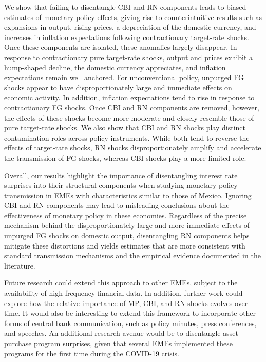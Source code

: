 \documentclass[12pt, reqno]{article}
\begin{document}
We show that failing to disentangle CBI and RN components leads to biased estimates of monetary policy effects, giving rise to counterintuitive results such as expansions in output, rising prices, a depreciation of the domestic currency, and increases in inflation expectations following contractionary target-rate shocks. Once these components are isolated, these anomalies largely disappear. In response to contractionary pure target-rate shocks,  output and prices exhibit a hump-shaped decline, the domestic currency appreciates, and inflation expectations remain well anchored. For unconventional policy, unpurged FG shocks appear to have disproportionately large and immediate effects on economic activity. In addition, inflation expectations tend to rise in response to contractionary FG shocks. Once CBI and RN components are removed, however, the effects of these shocks become more moderate and closely resemble those of pure target-rate shocks. We also show that CBI and RN shocks play distinct contamination roles across policy instruments. While both tend to reverse the effects of target-rate shocks, RN shocks disproportionately amplify and accelerate the transmission of FG shocks, whereas CBI shocks play a more limited role.

Overall, our results highlight the importance of disentangling interest rate surprises into their structural components when studying monetary policy transmission in EMEs with characteristics similar to those of Mexico. Ignoring CBI and RN components may lead to misleading conclusions about the effectiveness of monetary policy in these economies. Regardless of the precise mechanism behind the disproportionately large and more immediate effects of unpurged FG shocks on domestic output, disentangling RN components helps mitigate these distortions and yields estimates that are more consistent with standard transmission mechanisms and the empirical evidence documented in the literature.

Future research could extend this approach to other EMEs, subject to the availability of high-frequency financial data. In addition, further work could explore how the relative importance of MP, CBI, and RN shocks evolves over time. It would also be interesting to extend this framework to incorporate other forms of central bank communication, such as policy minutes, press conferences, and speeches. An additional research avenue would be to disentangle asset purchase program surprises, given that several EMEs implemented these programs for the first time during the COVID-19 crisis.
\end{document}
